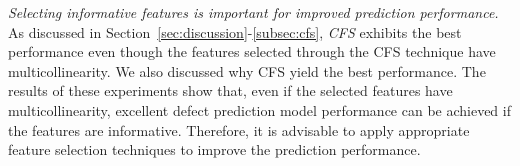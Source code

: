\emph{Selecting informative features is important for improved prediction performance.}
As discussed in Section~\ref{sec:discussion}-\ref{subsec:cfs}, \emph{CFS} exhibits the best performance even though the features selected through the CFS technique have multicollinearity. We also discussed why CFS yield the best performance.
The results of these experiments show that, even if the selected features have multicollinearity, excellent defect prediction model performance can be achieved if the features are informative. Therefore, it is advisable to apply appropriate feature selection techniques to improve the prediction performance.



